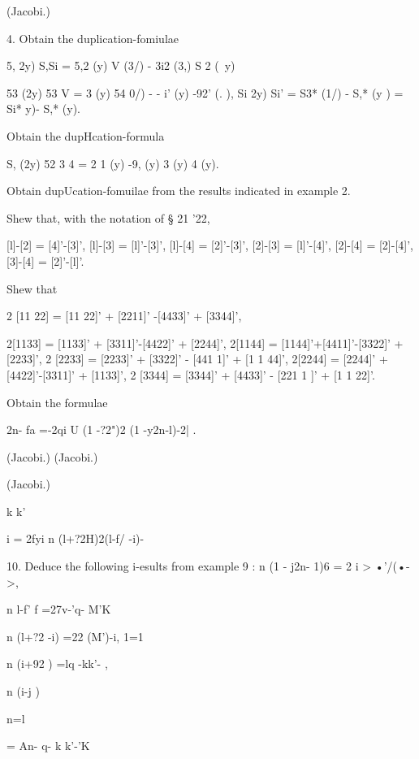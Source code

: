 (Jacobi.)

4. Obtain the duplication-fomiulae

5, 2y) S,Si = 5,2 (y) V (3/) - 3i2 (3,) S 2 (\ y)

53 (2y) 53 V = 3 (y) 54 0/) - - i' (y) -92' (. ), Si 2y) Si' = S3*
(1/) - S,* (y ) = Si* y)- S,* (y).



Obtain the dupHcation-formula

S, (2y) 52 3 4 = 2 1 (y) -9, (y) 3 (y) 4 (y).

Obtain dupUcation-fomuilae from the results indicated in example 2.

Shew that, with the notation of § 21 '22,

[l]-[2] = [4]'-[3]', [l]-[3] = [l]'-[3]', [l]-[4] = [2]'-[3]', [2]-[3]
= [l]'-[4]', [2]-[4] = [2]-[4]', [3]-[4] = [2]'-[l]'.

Shew that

2 [11 22] = [11 22]' + [2211]' -[4433]' + [3344]',

2[1133] = [1133]' + [3311]'-[4422]' + [2244]', 2[1144] =
[1144]'+[4411]'-[3322]' + [2233]', 2 [2233] = [2233]' + [3322]' - [441
1]' + [1 1 44]', 2[2244] = [2244]' + [4422]'-[3311]' + [1133]', 2
[3344] = [3344]' + [4433]' - [221 1 ]' + [1 1 22]'.

Obtain the formulae

2n- fa =-2qi U (1 -?2")2 (1 -y2n-l)-2| .



(Jacobi.) (Jacobi.)



(Jacobi.)



k k'



i = 2fyi n (l+?2H)2(l-f/ -i)-



10. Deduce the following i-esults from example 9 : n (1 - j2n- 1)6 = 2
i > •'/(•->,



n l-f' f =27v-'q- M'K\



n (l+?2 -i) =22 (M')-i, 1=1

n (i+92 ) =lq -kk'- ,



n (i-j )

n=l



= An- q- k k'-'K\



